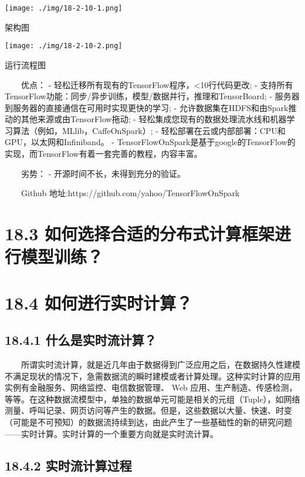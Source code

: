 \texttt{[image: ./img/18-2-10-1.png]}

架构图

\texttt{[image: ./img/18-2-10-2.png]}

运行流程图

  优点： - 轻松迁移所有现有的TensorFlow程序，\textless{}10行代码更改; -
支持所有TensorFlow功能：同步/异步训练，模型/数据并行，推理和TensorBoard;
- 服务器到服务器的直接通信在可用时实现更快的学习; -
允许数据集在HDFS和由Spark推动的其他来源或由TensorFlow拖动; -
轻松集成您现有的数据处理流水线和机器学习算法（例如，MLlib，CaffeOnSpark）;
- 轻松部署在云或内部部署：CPU和GPU，以太网和Infiniband。 -
TensorFlowOnSpark是基于google的TensorFlow的实现，而TensorFlow有着一套完善的教程，内容丰富。

  劣势： - 开源时间不长，未得到充分的验证。

  Github 地址:https://github.com/yahoo/TensorFlowOnSpark

\section{18.3
如何选择合适的分布式计算框架进行模型训练？}\label{ux5982ux4f55ux9009ux62e9ux5408ux9002ux7684ux5206ux5e03ux5f0fux8ba1ux7b97ux6846ux67b6ux8fdbux884cux6a21ux578bux8badux7ec3}

\section{18.4
如何进行实时计算？}\label{ux5982ux4f55ux8fdbux884cux5b9eux65f6ux8ba1ux7b97}

\subsection{18.4.1
什么是实时流计算？}\label{ux4ec0ux4e48ux662fux5b9eux65f6ux6d41ux8ba1ux7b97}

  所谓实时流计算，就是近几年由于数据得到广泛应用之后，在数据持久性建模不满足现状的情况下，急需数据流的瞬时建模或者计算处理。这种实时计算的应用实例有金融服务、网络监控、电信数据管理、
Web
应用、生产制造、传感检测，等等。在这种数据流模型中，单独的数据单元可能是相关的元组（Tuple），如网络测量、呼叫记录、网页访问等产生的数据。但是，这些数据以大量、快速、时变（可能是不可预知）的数据流持续到达，由此产生了一些基础性的新的研究问题------实时计算。实时计算的一个重要方向就是实时流计算。

\subsection{18.4.2
实时流计算过程}\label{ux5b9eux65f6ux6d41ux8ba1ux7b97ux8fc7ux7a0b}

